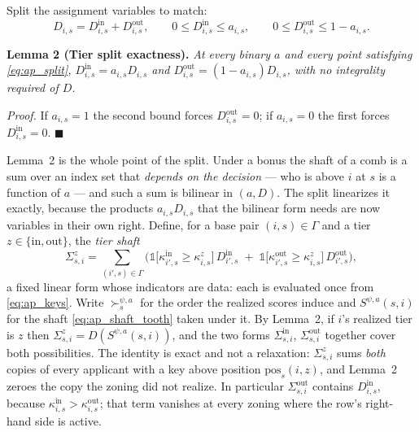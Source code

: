 \documentclass{article}
\begin{document}
Split the assignment variables to match:
\begin{equation}\label{eq:ap_split}
D_{i,s} = D^{\mathrm{in}}_{i,s} + D^{\mathrm{out}}_{i,s},
\qquad
0 \le D^{\mathrm{in}}_{i,s} \le a_{i,s},
\qquad
0 \le D^{\mathrm{out}}_{i,s} \le 1 - a_{i,s} .
\end{equation}

\noindent\textbf{Lemma 2 (Tier split exactness).} \textit{At every binary $a$ and every point satisfying \eqref{eq:ap_split}, $D^{\mathrm{in}}_{i,s} = a_{i,s} D_{i,s}$ and $D^{\mathrm{out}}_{i,s} = (1 - a_{i,s}) D_{i,s}$, with no integrality required of $D$.}

\textit{Proof.} If $a_{i,s} = 1$ the second bound forces $D^{\mathrm{out}}_{i,s} = 0$; if $a_{i,s} = 0$ the first forces $D^{\mathrm{in}}_{i,s} = 0$. $\blacksquare$

Lemma~2 is the whole point of the split. Under a bonus the shaft of a comb is a sum over an index set that \emph{depends on the decision} --- who is above $i$ at $s$ is a function of $a$ --- and such a sum is bilinear in $(a, D)$. The split linearizes it exactly, because the products $a_{i,s} D_{i,s}$ that the bilinear form needs are now variables in their own right. Define, for a base pair $(i,s) \in \Gamma$ and a tier $z \in \{\mathrm{in}, \mathrm{out}\}$, the \emph{tier shaft}
\begin{equation}\label{eq:ap_tier_shaft}
\Sigma^{z}_{s,i}
= \sum_{(i',s) \in \Gamma}
\Big(
\mathds{1}\big[\kappa^{\mathrm{in}}_{i',s} \ge \kappa^{z}_{i,s}\big]\, D^{\mathrm{in}}_{i',s}
\;+\;
\mathds{1}\big[\kappa^{\mathrm{out}}_{i',s} \ge \kappa^{z}_{i,s}\big]\, D^{\mathrm{out}}_{i',s}
\Big),
\end{equation}
a fixed linear form whose indicators are data: each is evaluated once from \eqref{eq:ap_keys}. Write $\succ_s^{\psi,a}$ for the order the realized scores induce and $S^{\psi,a}(s,i)$ for the shaft \eqref{eq:ap_shaft_tooth} taken under it. By Lemma~2, if $i$'s realized tier is $z$ then $\Sigma^{z}_{s,i} = D(S^{\psi,a}(s,i))$, and the two forms $\Sigma^{\mathrm{in}}_{s,i}$, $\Sigma^{\mathrm{out}}_{s,i}$ together cover both possibilities. The identity is exact and not a relaxation: $\Sigma^{z}_{s,i}$ sums \emph{both} copies of every applicant with a key above position $\mathrm{pos}_s(i,z)$, and Lemma~2 zeroes the copy the zoning did not realize. In particular $\Sigma^{\mathrm{out}}_{s,i}$ contains $D^{\mathrm{in}}_{i,s}$, because $\kappa^{\mathrm{in}}_{i,s} > \kappa^{\mathrm{out}}_{i,s}$; that term vanishes at every zoning where the row's right-hand side is active.
\end{document}
